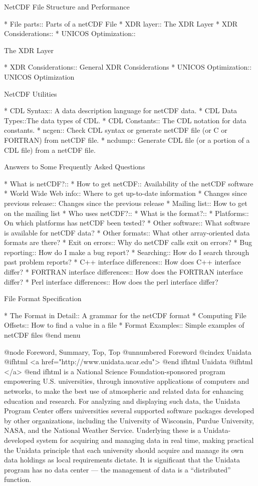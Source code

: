 NetCDF File Structure and Performance

* File parts::                  Parts of a netCDF File
* XDR layer::                   The XDR Layer
* XDR Considerations::
* UNICOS Optimization::

The XDR Layer

* XDR Considerations::  General XDR Considerations
* UNICOS Optimization::   UNICOS Optimization

NetCDF Utilities

* CDL Syntax::    A data description language for netCDF data.
* CDL Data Types::The data types of CDL.
* CDL Constants:: The CDL notation for data constants.
* ncgen::         Check CDL syntax or generate netCDF file (or C or FORTRAN)
                  from netCDF file.
* ncdump::        Generate CDL file (or a portion of a CDL file) from a netCDF
                  file.

Answers to Some Frequently Asked Questions

* What is netCDF?::
* How to get netCDF::           Availability of the netCDF software
* World Wide Web info::         Where to get up-to-date information
* Changes since previous release::  Changes since the previous release
* Mailing list::                How to get on the mailing list
* Who uses netCDF?::
* What is the format?::
* Platforms::                   On which platforms has netCDF been tested?
* Other software::              What software is available for netCDF data?
* Other formats::               What other array-oriented data formats are there?
* Exit on errors::              Why do netCDF calls exit on errors?
* Bug reporting::               How do I make a bug report?
* Searching::                   How do I search through past problem reports?
* C++ interface differences::   How does C++ interface differ?
* FORTRAN interface differences::  How does the FORTRAN interface differ?
* Perl interface differences::  How does the perl interface differ?

File Format Specification

* The Format in Detail::        A grammar for the netCDF format
* Computing File Offsets::      How to find a value in a file
* Format Examples::             Simple examples of netCDF files
@end menu

@node Foreword, Summary, Top, Top
@unnumbered Foreword
@cindex Unidata
@ifhtml
<a href="http://www.unidata.ucar.edu">
@end ifhtml
Unidata
@ifhtml
</a>
@end ifhtml
is a National Science Foundation-sponsored program empowering
U.S. universities, through innovative applications of computers and
networks, to make the best use of atmospheric and related data for
enhancing education and research.  For analyzing and displaying such
data, the Unidata Program Center offers universities several supported
software packages developed by other organizations, including the
University of Wisconsin, Purdue University, NASA, and the National
Weather Service.  Underlying these is a Unidata-developed system for
acquiring and managing data in real time, making
practical the Unidata principle that each university should acquire and
manage its own data holdings as local requirements dictate.  It is
significant that the Unidata program has no data center --- the
management of data is a ``distributed'' function.

